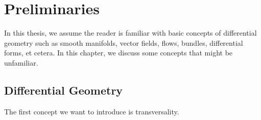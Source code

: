 \setcounter{chapter}{-1}
\chapter{Preliminaries}

In this thesis, we assume the reader is familiar with basic concepts of differential geometry such as smooth manifolds, vector fields, flows, bundles, differential forms, et cetera.
In this chapter, we discuss some concepts that might be unfamiliar.

\section*{Differential Geometry}
The first concept we want to introduce is transversality.



